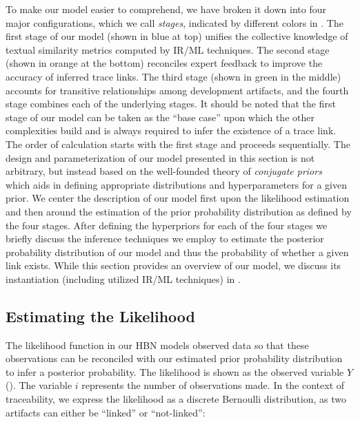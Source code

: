 To make our model easier to comprehend, we have broken it down into four major configurations, which we call \textit{stages}, indicated by different colors in . The first stage of our model (shown in blue at top) unifies the collective knowledge of textual similarity metrics computed by IR/ML techniques. The second stage (shown in orange at the bottom) reconciles expert feedback to improve the accuracy of inferred trace links. The third stage (shown in green in the middle) accounts for transitive relationships among development artifacts, and the fourth stage combines each of the underlying stages. It should be noted that the first stage of our model can be taken as the ``base case'' upon which the other complexities build and is always required to infer the existence of a trace link.  The order of calculation starts with the first stage and proceeds sequentially. The design and parameterization of our model presented in this section is not arbitrary, but instead based on the well-founded theory of \textit{conjugate priors}~\citep{Raiffa:61} which aids in defining appropriate distributions and hyperparameters for a given prior. We center the description of our model first upon the likelihood estimation and then around the estimation of the prior probability distribution as defined by the four stages. After defining the hyperpriors for each of the four stages we briefly discuss the inference techniques we employ to estimate the posterior probability distribution of our model and thus the probability of whether a given link exists. While this section provides an overview of our model, we discuss its instantiation (including utilized IR/ML techniques) in  .


\subsection{Estimating the Likelihood}
\label{sub:model-likelihood}

The likelihood function in our HBN models observed data so that these observations can be reconciled with our estimated prior probability distribution to infer a posterior probability.  The likelihood is shown as the observed variable $Y$ (). The variable $i$ represents the number of observations made. In the context of traceability, we express the likelihood as a discrete Bernoulli distribution, as two artifacts can either be ``linked'' or ``not-linked'':

